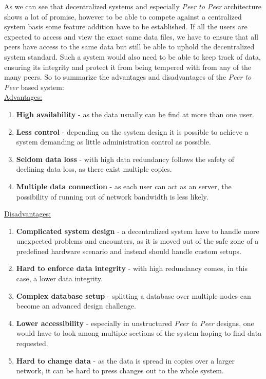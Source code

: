 \documentclass[paper=a4, fontsize=11pt]{scrartcl} %
\numberwithin{equation}{section} %
\numberwithin{figure}{section} %
\numberwithin{table}{section} %
\begin{document}
As we can see that decentralized systems and especially \textit{Peer to Peer} architecture shows a lot of promise, however to be able to compete against a centralized system basis some feature addition have to be established. If all the users are expected to access and view the exact same data files, we have to ensure that all peers have access to the same data but still be able to uphold the decentralized system standard. Such a system would also need to be able to keep track of data, ensuring its integrity and protect it from being tempered with from any of the many peers\cite{distributed}. So to summarize the advantages and disadvantages of the \textit{Peer to Peer} based system:\\

\underline{Advantages:}

\begin{enumerate}
\item \textbf{High availability} - as the data usually can be find at more than one user.
\item \textbf{Less control} - depending on the system design it is possible to achieve a system demanding as little administration control as possible.
\item \textbf{Seldom data loss} - with high data redundancy follows the safety of declining data loss, as there exist multiple copies. 
\item \textbf{Multiple data connection} - as each user can act as an server, the possibility of running out of network bandwidth is less likely.  
\end{enumerate}

\underline{Disadvantages:}

\begin{enumerate}
\item \textbf{Complicated system design} - a decentralized system have to handle more unexpected problems and encounters, as it is moved out of the safe zone of a predefined hardware scenario and instead should handle custom setups.
\item \textbf{Hard to enforce data integrity} - with high redundancy comes, in this case, a lower data integrity.
\item \textbf{Complex database setup} - splitting a database over multiple nodes can become an advanced design challenge.
\item \textbf{Lower accessibility} - especially in unstructured \textit{Peer to Peer} designs, one would have to look among multiple sections of the system hoping to find data requested. 
\item \textbf{Hard to change data} - as the data is spread in copies over a larger network, it can be hard to press changes out to the whole system.
\end{enumerate}
\end{document}
